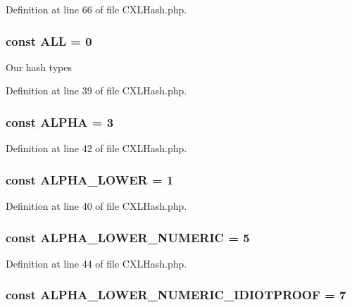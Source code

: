 Definition at line 66 of file CXLHash.php.

\hypertarget{classCXLHash_ab56e734000051e5c12c8c5cf6d8d160d}{
\subsubsection[{ALL}]{\setlength{\rightskip}{0pt plus 5cm}const {\bf ALL} = 0}}
\label{classCXLHash_ab56e734000051e5c12c8c5cf6d8d160d}
Our hash types 

Definition at line 39 of file CXLHash.php.

\hypertarget{classCXLHash_a6bb7987358cd3de8e7c775094597e631}{
\subsubsection[{ALPHA}]{\setlength{\rightskip}{0pt plus 5cm}const {\bf ALPHA} = 3}}
\label{classCXLHash_a6bb7987358cd3de8e7c775094597e631}


Definition at line 42 of file CXLHash.php.

\hypertarget{classCXLHash_a33fc57236d932860ab0ad8e8268e0c99}{
\subsubsection[{ALPHA\_\-LOWER}]{\setlength{\rightskip}{0pt plus 5cm}const {\bf ALPHA\_\-LOWER} = 1}}
\label{classCXLHash_a33fc57236d932860ab0ad8e8268e0c99}


Definition at line 40 of file CXLHash.php.

\hypertarget{classCXLHash_a371814049e51cde466af6295bdfed4e3}{
\subsubsection[{ALPHA\_\-LOWER\_\-NUMERIC}]{\setlength{\rightskip}{0pt plus 5cm}const {\bf ALPHA\_\-LOWER\_\-NUMERIC} = 5}}
\label{classCXLHash_a371814049e51cde466af6295bdfed4e3}


Definition at line 44 of file CXLHash.php.

\hypertarget{classCXLHash_aa15c0932a4cd96ab710478faace6ccb9}{
\subsubsection[{ALPHA\_\-LOWER\_\-NUMERIC\_\-IDIOTPROOF}]{\setlength{\rightskip}{0pt plus 5cm}const {\bf ALPHA\_\-LOWER\_\-NUMERIC\_\-IDIOTPROOF} = 7}}
\label{classCXLHash_aa15c0932a4cd96ab710478faace6ccb9}


